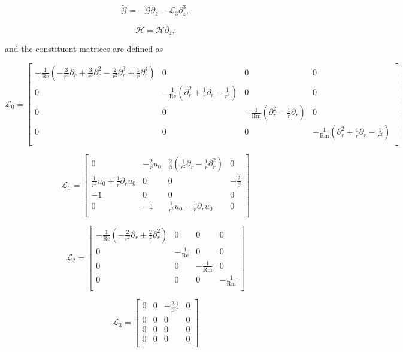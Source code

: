 \documentclass{emulateapj}
\newcommand{\beq}{\begin{equation}}
\newcommand{\eeq}{\end{equation}}
\newcommand\reye{\mathrm{Re}}
\newcommand\reym{\mathrm{Rm}}
\begin{document}
\beq
\widetilde{\mathcal{G}} = - \mathcal{G} \partial_z - \mathcal{L}_3 \partial_z^3,
\eeq

\beq
\widetilde{\mathcal{H}} = \mathcal{H} \partial_z,
\eeq

and the constituent matrices are defined as 

\beq
\mathcal{L}_0 = \left[\begin{matrix}
-\frac{1}{\reye} (-\frac{3}{r^4} \partial_r + \frac{3}{r^3}\partial_r^2 - \frac{2}{r^2}\partial_r^3 + \frac{1}{r}\partial_r^4) & 0 & 0 & 0 \\
0 & -\frac{1}{\reye} (\partial_r^2 + \frac{1}{r}\partial_r - \frac{1}{r^2}) & 0 & 0 \\
0 & 0 & -\frac{1}{\reym} (\partial_r^2 - \frac{1}{r} \partial_r) & 0 \\
0 & 0 & 0 & -\frac{1}{\reym} (\partial_r^2 + \frac{1}{r}\partial_r - \frac{1}{r^2}) \\
\end{matrix}\right]
\eeq

\beq
\mathcal{L}_1 = \left[\begin{matrix}
0 & -\frac{2}{r} u_0 & \frac{2}{\beta} (\frac{1}{r^2} \partial_r - \frac{1}{r}\partial_r^2) & 0 \\
\frac{1}{r^2} u_0 + \frac{1}{r}\partial_r u_0 & 0 & 0 & -\frac{2}{\beta} \\
-1 & 0 & 0 & 0 \\
0 & -1 & \frac{1}{r^2} u_0 - \frac{1}{r} \partial_r u_0 & 0 \\
\end{matrix}\right]
\eeq


\beq
\mathcal{L}_2 = \left[\begin{matrix}
-\frac{1}{\reye} (-\frac{2}{r^2}\partial_r + \frac{2}{r}\partial_r^2) & 0 & 0 & 0 \\
0 & -\frac{1}{\reye} & 0 & 0 \\
0 & 0 & -\frac{1}{\reym} & 0 \\
0 & 0 & 0 & -\frac{1}{\reym} \\
\end{matrix}\right]
\eeq

\beq
\mathcal{L}_3 = \left[\begin{matrix}
0 & 0 & -\frac{2}{\beta}\frac{1}{r} & 0 \\
0 & 0 & 0 & 0 \\
0 & 0 & 0 & 0 \\
0 & 0 & 0 & 0 \\
\end{matrix}\right]
\eeq
\end{document}
